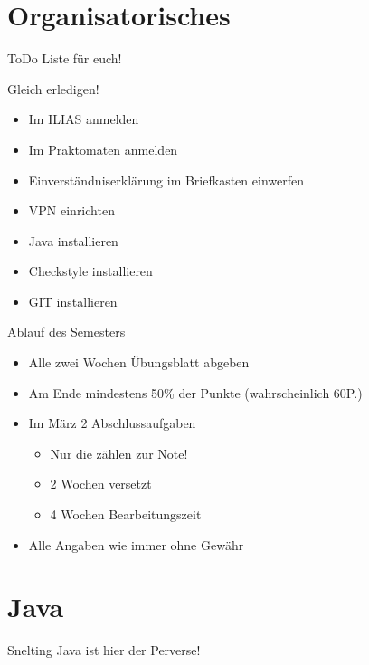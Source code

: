 \documentclass{beamer}
\begin{document}
\section{Organisatorisches}
\begin{frame}{ToDo Liste für euch!}
\begin{alertblock}{Gleich erledigen!}
\begin{itemize}
 \item Im ILIAS anmelden
 \item Im Praktomaten anmelden
 \item Einverständniserklärung im Briefkasten einwerfen
 \item VPN einrichten
 \item Java installieren
 \item Checkstyle installieren
 \item GIT installieren
\end{itemize}
\end{alertblock}
\end{frame}

\begin{frame}{Ablauf des Semesters}
\begin{alertblock}{}
\begin{itemize}
 \item Alle zwei Wochen Übungsblatt abgeben
 \item Am Ende mindestens 50\% der Punkte (wahrscheinlich 60P.)
 \item Im März 2 Abschlussaufgaben
  \begin{itemize}
        \item Nur die zählen zur Note!
        \item 2 Wochen versetzt
        \item 4 Wochen Bearbeitungszeit
       \end{itemize}
  \pause
  \item Alle Angaben wie immer ohne Gewähr
\end{itemize}
\end{alertblock}
\end{frame}


\section{Java}
\begin{frame}
 \begin{exampleblock}{Snelting}
  Java ist hier der Perverse!
 \end{exampleblock}

\end{frame}
\end{document}
